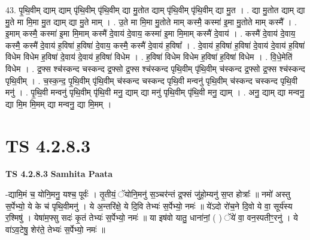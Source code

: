 \documentclass[17pt]{extarticle}
\begin{document}
43. पृ॒थि॒वीम् द्याम् द्याम् पृ॑थि॒वीम् पृ॑थि॒वीम् द्या मु॒तोत द्याम् पृ॑थि॒वीम् पृ॑थि॒वीम् द्या मु॒त । . द्या मु॒तोत द्याम् द्या मु॒ते मा मि॒मा मु॒त द्याम् द्या मु॒ते माम् । . उ॒ते मा मि॒मा मु॒तोते माम् कस्मै॒ कस्मा॑ इ॒मा मु॒तोते माम् कस्मै᳚ । . इ॒माम् कस्मै॒ कस्मा॑ इ॒मा मि॒माम् कस्मै॑ दे॒वाय॑ दे॒वाय॒ कस्मा॑ इ॒मा मि॒माम् कस्मै॑ दे॒वाय॑ । . कस्मै॑ दे॒वाय॑ दे॒वाय॒ कस्मै॒ कस्मै॑ दे॒वाय॑ ह॒विषा॑ ह॒विषा॑ दे॒वाय॒ कस्मै॒ कस्मै॑ दे॒वाय॑ ह॒विषा᳚ । . दे॒वाय॑ ह॒विषा॑ ह॒विषा॑ दे॒वाय॑ दे॒वाय॑ ह॒विषा॑ विधेम विधेम ह॒विषा॑ दे॒वाय॑ दे॒वाय॑ ह॒विषा॑ विधेम । . ह॒विषा॑ विधेम विधेम ह॒विषा॑ ह॒विषा॑ विधेम । . वि॒धे॒मेति॑ विधेम । . द्र॒फ्स श्च॑स्कन्द चस्कन्द द्र॒फ्सो द्र॒फ्स श्च॑स्कन्द पृथि॒वीम् पृ॑थि॒वीम् च॑स्कन्द द्र॒फ्सो द्र॒फ्स श्च॑स्कन्द पृथि॒वीम् । . च॒स्क॒न्द॒ पृ॒थि॒वीम् पृ॑थि॒वीम् च॑स्कन्द चस्कन्द पृथि॒वी मन्वनु॑ पृथि॒वीम् च॑स्कन्द चस्कन्द पृथि॒वी मनु॑ । . पृ॒थि॒वी मन्वनु॑ पृथि॒वीम् पृ॑थि॒वी मनु॒ द्याम् द्या मनु॑ पृथि॒वीम् पृ॑थि॒वी मनु॒ द्याम् । . अनु॒ द्याम् द्या मन्वनु॒ द्या मि॒म मि॒मम् द्या मन्वनु॒ द्या मि॒मम् । \newline
\pagebreak
{}

\section{ TS 4.2.8.3 }

\textbf{TS 4.2.8.3 } \newline
\textbf{Samhita Paata} \newline

-द्यामि॒मं च॒ योनि॒मनु॒ यश्च॒ पूर्वः॑ । तृ॒तीयं॒ ॅयोनि॒मनु॑ स॒ञ्चर॑न्तं द्र॒फ्सं जु॑हो॒म्यनु॑ स॒प्त होत्राः᳚ ॥ नमो॑ अस्तु स॒र्पेभ्यो॒ ये के च॑ पृथि॒वीमनु॑ । ये अ॒न्तरि॑क्षे॒ ये दि॒वि तेभ्यः॑ स॒र्पेभ्यो॒ नमः॑ ॥ ये॑ऽदो रो॑च॒ने दि॒वो ये वा॒ सूर्य॑स्य र॒श्मिषु॑ । येषा॑म॒फ्सु सदः॑ कृ॒तं तेभ्यः॑ स॒र्पेभ्यो॒ नमः॑ ॥ या इष॑वो यातु॒ धाना॑नां॒ ( ) ॅये॑ वा॒ वन॒स्पतीꣳ॒॒रनु॑ । ये वा॑ऽव॒टेषु॒ शेर॑ते॒ तेभ्यः॑ स॒र्पेभ्यो॒ नमः॑ ॥ \newline
\end{document}
